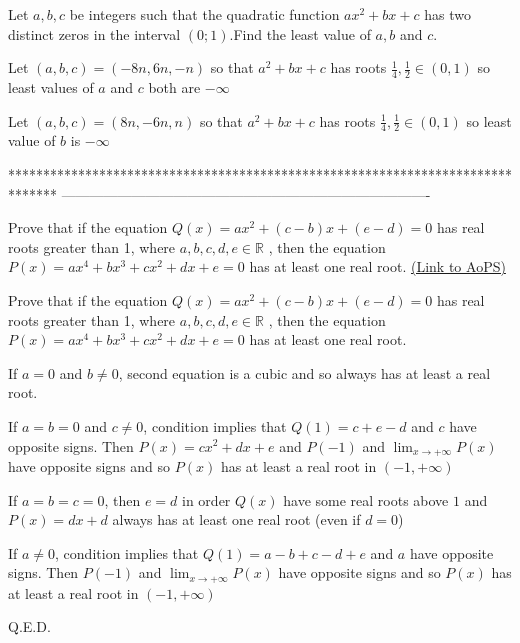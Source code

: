 \begin{solution}
	\begin{tcolorbox}Let $a,b,c$ be integers such that the quadratic function $ax^2+bx+c$ has two distinct zeros in the interval $(0;1)$.Find the least value of $a,b$ and $c$.\end{tcolorbox}
Let $(a,b,c)=(-8n,6n,-n)$ so that $a^2+bx+c$ has roots $\frac 14,\frac 12\in(0,1)$ so least values of $a$ and $c$ both are $-\infty$

Let $(a,b,c)=(8n,-6n,n)$ so that $a^2+bx+c$ has roots $\frac 14,\frac 12\in(0,1)$ so least value of $b$ is $-\infty$
\end{solution}
*******************************************************************************
-------------------------------------------------------------------------------

\begin{problem}
	Prove that if the equation $Q(x)=ax^2+(c-b)x+(e-d)=0$ has real roots greater than 1, where $a,b,c,d,e\in\mathbb{R}$ , then the equation $P(x)=ax^4+bx^3+cx^2+dx+e=0$ has at least one real root.
	\flushright \href{https://artofproblemsolving.com/community/c6h565366}{(Link to AoPS)}
\end{problem}



\begin{solution}
	\begin{tcolorbox}Prove that if the equation $Q(x)=ax^2+(c-b)x+(e-d)=0$ has real roots greater than 1, where $a,b,c,d,e\in\mathbb{R}$ , then the equation $P(x)=ax^4+bx^3+cx^2+dx+e=0$ has at least one real root.\end{tcolorbox}
If $a=0$ and $b\ne 0$, second equation is a cubic and so always has at least a real root.

If $a=b=0$ and $c\ne 0$, condition implies that $Q(1)=c+e-d$ and $c$ have opposite signs.
Then $P(x)=cx^2+dx+e$ and $P(-1)$ and $\lim_{x\to +\infty}P(x)$ have opposite signs and so $P(x)$ has at least a real root in $(-1,+\infty)$

If $a=b=c=0$, then $e=d$ in order $Q(x)$ have some real roots above $1$ and $P(x)=dx+d$ always has at least one real root (even if $d=0$)

If $a\ne 0$, condition implies that $Q(1)=a-b+c-d+e$ and $a$ have opposite signs.
Then $P(-1)$ and $\lim_{x\to +\infty}P(x)$ have opposite signs and so $P(x)$ has at least a real root in $(-1,+\infty)$

Q.E.D.
\end{solution}



